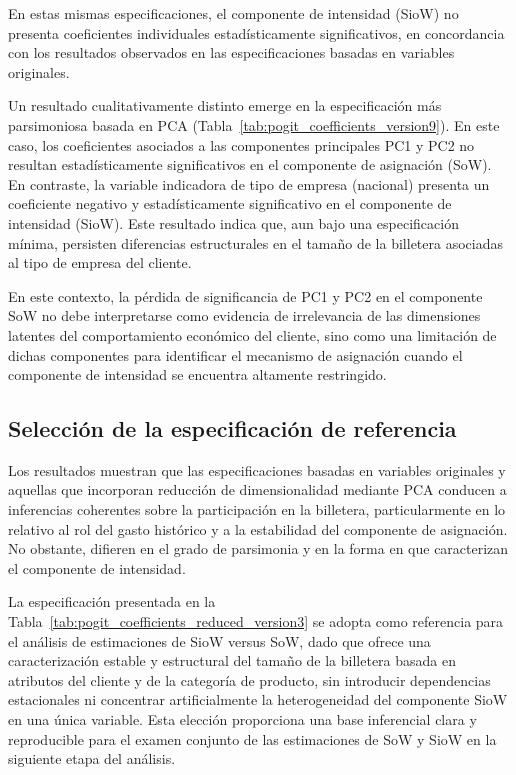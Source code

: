     En estas mismas especificaciones, el componente de intensidad (SioW) no presenta coeficientes individuales estadísticamente significativos, en concordancia con los resultados observados en las especificaciones basadas en variables originales.

    Un resultado cualitativamente distinto emerge en la especificación más parsimoniosa basada en PCA (Tabla~\ref{tab:pogit_coefficients_version9}). En este caso, los coeficientes asociados a las componentes principales PC1 y PC2 no resultan estadísticamente significativos en el componente de asignación (SoW). En contraste, la variable indicadora de tipo de empresa (nacional) presenta un coeficiente negativo y estadísticamente significativo en el componente de intensidad (SioW). Este resultado indica que, aun bajo una especificación mínima, persisten diferencias estructurales en el tamaño de la billetera asociadas al tipo de empresa del cliente.

    En este contexto, la pérdida de significancia de PC1 y PC2 en el componente SoW no debe interpretarse como evidencia de irrelevancia de las dimensiones latentes del comportamiento económico del cliente, sino como una limitación de dichas componentes para identificar el mecanismo de asignación cuando el componente de intensidad se encuentra altamente restringido.

\subsection{Selección de la especificación de referencia}
    Los resultados muestran que las especificaciones basadas en variables originales y aquellas que incorporan reducción de dimensionalidad mediante PCA conducen a inferencias coherentes sobre la participación en la billetera, particularmente en lo relativo al rol del gasto histórico y a la estabilidad del componente de asignación. No obstante, difieren en el grado de parsimonia y en la forma en que caracterizan el componente de intensidad.
    
    La especificación presentada en la Tabla~\ref{tab:pogit_coefficients_reduced_version3} se adopta como referencia para el análisis de estimaciones de SioW versus SoW, dado que ofrece una caracterización estable y estructural del tamaño de la billetera basada en atributos del cliente y de la categoría de producto, sin introducir dependencias estacionales ni concentrar artificialmente la heterogeneidad del componente SioW en una única variable. Esta elección proporciona una base inferencial clara y reproducible para el examen conjunto de las estimaciones de SoW y SioW en la siguiente etapa del análisis.

